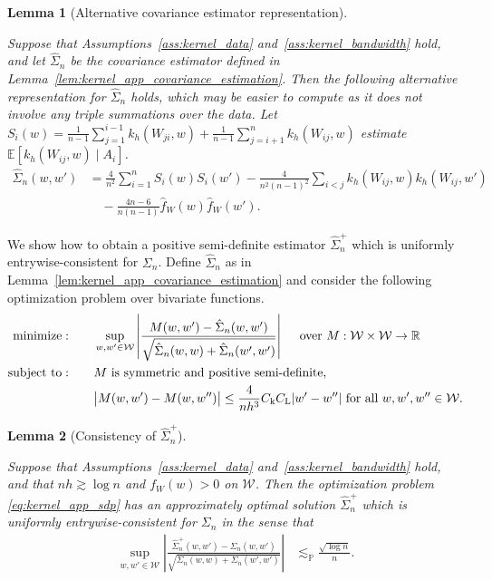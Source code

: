 \documentclass[11pt,lof]{puthesis}
\renewcommand{\P}{\ensuremath{\mathbb{P}}}
\newcommand{\R}{\ensuremath{\mathbb{R}}}
\newcommand{\E}{\ensuremath{\mathbb{E}}}
\newcommand{\rL}{\ensuremath{\mathrm{L}}}
\newcommand{\rk}{\ensuremath{\mathrm{k}}}
\newcommand{\cW}{\ensuremath{\mathcal{W}}}
\DeclareMathOperator*{\minimize}{minimize:}
\DeclareMathOperator*{\subjectto}{subject\ to:}
\theoremstyle{break}
\newtheorem{lemma}{Lemma}[section]
\theoremstyle{proof}
\begin{document}
\begin{lemma}[Alternative covariance estimator representation]
  \label{lem:kernel_app_alternative_covariance_estimator}

  Suppose that Assumptions~\ref{ass:kernel_data}
  and~\ref{ass:kernel_bandwidth} hold,
  and let $\hat \Sigma_n$
  be the covariance estimator defined
  in Lemma~\ref{lem:kernel_app_covariance_estimation}.
  Then the following alternative representation
  for $\hat \Sigma_n$ holds,
  which may be easier to compute
  as it does not involve any triple summations
  over the data.
  Let $S_i(w) = \frac{1}{n-1}
  \sum_{j = 1}^{i-1} k_h(W_{j i}, w)
  + \frac{1}{n-1} \sum_{j = i+1}^n k_h(W_{i j}, w)$
  estimate $\E[k_h(W_{i j},w) \mid A_i]$.
  \begin{align*}
    \hat \Sigma_n(w,w')
    &=
    \frac{4}{n^2}
    \sum_{i=1}^n
    S_i(w) S_i(w')
    - \frac{4}{n^2(n-1)^2}
    \sum_{i<j}
    k_h(W_{i j},w)
    k_h(W_{i j},w') \\
    &\quad-
    \frac{4n-6}{n(n-1)}
    \hat f_W(w)
    \hat f_W(w').
  \end{align*}
\end{lemma}

We show how to obtain a positive semi-definite estimator $\hat \Sigma_n^+$
which is uniformly entrywise-consistent for $\Sigma_n$. Define $\hat \Sigma_n$
as in Lemma~\ref{lem:kernel_app_covariance_estimation} and consider the
following
optimization problem over bivariate functions.
%
\begin{equation}
  \label{eq:kernel_app_sdp}
  \begin{aligned}
    \minimize
    \qquad
    & \sup_{w,w' \in \cW}
    \left|
    \frac{M(w,w') - \hat\Sigma_n(w,w')}
    {\sqrt{\hat \Sigma_n(w,w) + \hat \Sigma_n(w',w')}}
    \right|
    \quad \textup{ over } M: \cW \times \cW \to \R
    \\
    \subjectto
    \qquad
    & M \textup{ is symmetric and positive semi-definite}, \\
    & \big|M(w,w') - M(w, w'')\big|
    \leq \frac{4}{n h^3}
    C_\rk C_\rL
    |w'-w''|
    \textup{ for all }
    w, w', w'' \in \cW.
  \end{aligned}
\end{equation}

\begin{lemma}[Consistency of $\hat \Sigma_n^+$]
  \label{lem:kernel_app_sdp}

  Suppose that Assumptions~\ref{ass:kernel_data}
  and~\ref{ass:kernel_bandwidth} hold, and that
  $n h \gtrsim \log n$ and $f_W(w) > 0$ on $\cW$.
  Then the optimization problem \eqref{eq:kernel_app_sdp}
  has an approximately optimal solution $\hat\Sigma_n^+$
  which is uniformly entrywise-consistent
  for $\Sigma_n$ in the sense that
  \begin{align*}
    \sup_{w,w' \in \cW}
    \left|
    \frac{\hat \Sigma_n^+(w,w') - \Sigma_n(w,w')}
    {\sqrt{\Sigma_n(w,w) + \Sigma_n(w',w')}}
    \right|
    &\lesssim_\P
    \frac{\sqrt{\log n}}{n}.
  \end{align*}

\end{lemma}
\end{document}
